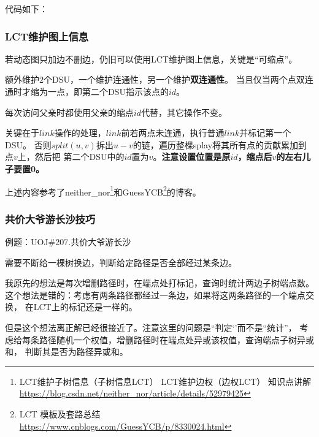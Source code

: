 代码如下：


\subsubsection{LCT维护图上信息}
若动态图只加边不删边，仍旧可以使用LCT维护图上信息，关键是``可缩点''。

额外维护2个DSU，一个维护连通性，另一个维护{\bfseries 双连通性}。
当且仅当两个点双连通时才缩为一点，即第二个DSU指示该点的$id$。

每次访问父亲时都使用父亲的缩点$id$代替，其它操作不变。

关键在于$link$操作的处理，$link$前若两点未连通，执行普通$link$并标记第一个DSU。
否则$split(u,v)$拆出$u-v$的链，遍历整棵splay将其所有点的贡献累加到点$v$上，然后把
第二个DSU中的$id$置为$v$。{\bfseries 注意设置位置是原$id$，缩点后$v$的左右儿子要置0。}

上述内容参考了neither\_nor\footnote{
    LCT维护子树信息（子树信息LCT） LCT维护边权（边权LCT） 知识点讲解
    \url{https://blog.csdn.net/neither\_nor/article/details/52979425}
}和GuessYCB\footnote{
    LCT 模板及套路总结
    \url{https://www.cnblogs.com/GuessYCB/p/8330024.html}
}的博客。

\subsubsection{共价大爷游长沙技巧}
例题：UOJ\#207.共价大爷游长沙

需要不断给一棵树换边，判断给定路径是否全部经过某条边。

我原先的想法是每次增删路径时，在端点处打标记，查询时统计两边子树端点数。
这个想法是错的：考虑有两条路径都经过一条边，如果将这两条路径的一个端点交换，
在LCT上的标记还是一样的。

但是这个想法离正解已经很接近了。注意这里的问题是``判定‘'而不是``统计''，
考虑给每条路径随机一个权值，增删路径时在端点处异或该权值，查询端点子树异或和，
判断其是否为路径异或和。
